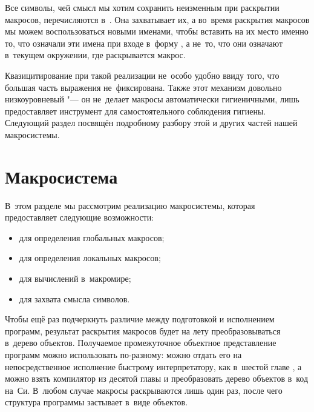 Все символы, чей смысл мы хотим сохранить неизменным при раскрытии макросов,
перечисляются в~. Она захватывает их, а во~время раскрытия
макросов мы можем воспользоваться новыми именами, чтобы вставить на их место
именно то, что означали эти имена при входе в~форму , а не~то,
что они означают в~текущем окружении, где раскрывается макрос.

Квазицитирование при такой реализации не~особо удобно ввиду того, что большая
часть выражения не~фиксирована. Также этот механизм довольно низкоуровневый "---
он не~делает макросы автоматически гигиеничными, лишь предоставляет инструмент
для самостоятельного соблюдения гигиены. Следующий раздел посвящён подробному
разбору этой и других частей нашей макросистемы.


\section{Макросистема}\label{macros/sect:macrosystem}

В~этом разделе мы рассмотрим реализацию макросистемы, которая предоставляет
следующие возможности:

\begin{itemize}
  \item {} для определения глобальных макросов;

  \item {} для определения локальных макросов;

  \item {} для вычислений в~макромире;

  \item {} для захвата смысла символов.
\end{itemize}

Чтобы ещё раз подчеркнуть различие между подготовкой и исполнением программ,
результат раскрытия макросов будет на лету преобразовываться в~дерево объектов.
Получаемое промежуточное объектное представление программ можно использовать
по-разному: можно отдать его на непосредственное исполнение быстрому
интерпретатору, как в~шестой главе , а можно взять
компилятор из десятой главы \seePage[chapter:cc] и преобразовать дерево объектов
в~код на~Си. В~любом случае макросы раскрываются лишь один раз, после чего
структура программы застывает в~виде объектов.


